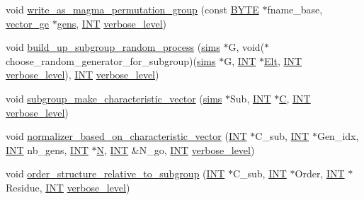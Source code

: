 \begin{DoxyCompactItemize}
\item 
void \mbox{\hyperlink{classsims_a6621d6ec45449ab1aa7bed5d72e5a829}{write\+\_\+as\+\_\+magma\+\_\+permutation\+\_\+group}} (const \mbox{\hyperlink{galois_8h_ab6cc7b4aeb6ea31aba2b3fbfc83ff5e6}{B\+Y\+TE}} $\ast$fname\+\_\+base, \mbox{\hyperlink{classvector__ge}{vector\+\_\+ge}} $\ast$\mbox{\hyperlink{classsims_ac1db131c547341a79a8955526bf8cdf6}{gens}}, \mbox{\hyperlink{galois_8h_a09fddde158a3a20bd2dcadb609de11dc}{I\+NT}} \mbox{\hyperlink{simeon_8_c_a818073fbcc2f439e7c56952f67386122}{verbose\+\_\+level}})
\item 
void \mbox{\hyperlink{classsims_abd2e45239922c514c61c6ac523b72af0}{build\+\_\+up\+\_\+subgroup\+\_\+random\+\_\+process}} (\mbox{\hyperlink{classsims}{sims}} $\ast$G, void($\ast$choose\+\_\+random\+\_\+generator\+\_\+for\+\_\+subgroup)(\mbox{\hyperlink{classsims}{sims}} $\ast$G, \mbox{\hyperlink{galois_8h_a09fddde158a3a20bd2dcadb609de11dc}{I\+NT}} $\ast$\mbox{\hyperlink{simeon_8_c_aec1406935bdb1fee3561fcb840964100}{Elt}}, \mbox{\hyperlink{galois_8h_a09fddde158a3a20bd2dcadb609de11dc}{I\+NT}} \mbox{\hyperlink{simeon_8_c_a818073fbcc2f439e7c56952f67386122}{verbose\+\_\+level}}), \mbox{\hyperlink{galois_8h_a09fddde158a3a20bd2dcadb609de11dc}{I\+NT}} \mbox{\hyperlink{simeon_8_c_a818073fbcc2f439e7c56952f67386122}{verbose\+\_\+level}})
\item 
void \mbox{\hyperlink{classsims_a8abb8f266671da3862c8bc60294c23e8}{subgroup\+\_\+make\+\_\+characteristic\+\_\+vector}} (\mbox{\hyperlink{classsims}{sims}} $\ast$Sub, \mbox{\hyperlink{galois_8h_a09fddde158a3a20bd2dcadb609de11dc}{I\+NT}} $\ast$\mbox{\hyperlink{costas_8_c_aacbbb35f36efadbb40803bfb5480b737}{C}}, \mbox{\hyperlink{galois_8h_a09fddde158a3a20bd2dcadb609de11dc}{I\+NT}} \mbox{\hyperlink{simeon_8_c_a818073fbcc2f439e7c56952f67386122}{verbose\+\_\+level}})
\item 
void \mbox{\hyperlink{classsims_af81961f706ea98f0afd845146274a394}{normalizer\+\_\+based\+\_\+on\+\_\+characteristic\+\_\+vector}} (\mbox{\hyperlink{galois_8h_a09fddde158a3a20bd2dcadb609de11dc}{I\+NT}} $\ast$C\+\_\+sub, \mbox{\hyperlink{galois_8h_a09fddde158a3a20bd2dcadb609de11dc}{I\+NT}} $\ast$Gen\+\_\+idx, \mbox{\hyperlink{galois_8h_a09fddde158a3a20bd2dcadb609de11dc}{I\+NT}} nb\+\_\+gens, \mbox{\hyperlink{galois_8h_a09fddde158a3a20bd2dcadb609de11dc}{I\+NT}} $\ast$\mbox{\hyperlink{_a_p_p_s_2_t_d_o_2packing_8_c_a0240ac851181b84ac374872dc5434ee4}{N}}, \mbox{\hyperlink{galois_8h_a09fddde158a3a20bd2dcadb609de11dc}{I\+NT}} \&N\+\_\+go, \mbox{\hyperlink{galois_8h_a09fddde158a3a20bd2dcadb609de11dc}{I\+NT}} \mbox{\hyperlink{simeon_8_c_a818073fbcc2f439e7c56952f67386122}{verbose\+\_\+level}})
\item 
void \mbox{\hyperlink{classsims_a50d22de4969a10d88c7e7eece0ea0e3c}{order\+\_\+structure\+\_\+relative\+\_\+to\+\_\+subgroup}} (\mbox{\hyperlink{galois_8h_a09fddde158a3a20bd2dcadb609de11dc}{I\+NT}} $\ast$C\+\_\+sub, \mbox{\hyperlink{galois_8h_a09fddde158a3a20bd2dcadb609de11dc}{I\+NT}} $\ast$Order, \mbox{\hyperlink{galois_8h_a09fddde158a3a20bd2dcadb609de11dc}{I\+NT}} $\ast$Residue, \mbox{\hyperlink{galois_8h_a09fddde158a3a20bd2dcadb609de11dc}{I\+NT}} \mbox{\hyperlink{simeon_8_c_a818073fbcc2f439e7c56952f67386122}{verbose\+\_\+level}})
\end{DoxyCompactItemize}
